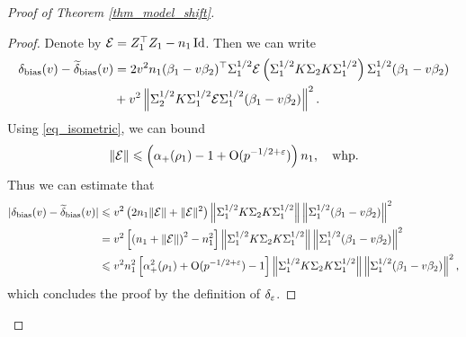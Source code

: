 \begin{proof}[Proof of Theorem \ref{thm_model_shift}]
\begin{proof}
	Denote by $\mathcal{E} = Z_1^{\top}Z_1 - {n_1}\operatorname{Id}$. Then we can write
	\begin{align}
		 \delta_{\text{bias}}(v)-\widetilde\delta_{\text{bias}}(v)&= {2v^2n_1}(\beta_1 - v\beta_2)^{\top}\Sigma_1^{1/2} \mathcal{E}\left(\Sigma_1^{1/2}K \Sigma_2 K \Sigma_1^{1/2}\right) \Sigma_1^{1/2} (\beta_1 - v\beta_2) \nonumber
		\\
		&+ v^2\left\| \Sigma_2^{1/2} K \Sigma_1^{1/2}\mathcal{E} \Sigma_1^{1/2}(\beta_1 - v\beta_2) \right\|^2. \label{eq_lem_model_shift_1}
	\end{align}
	Using \eqref{eq_isometric}, we can bound  
	$$\|\mathcal E\|\leqslant \left( \alpha_+(\rho_1)-1 + \operatorname{O}(p^{-1/2+{\varepsilon}})\right)n_1, \quad \text{whp}.$$
	Thus we can estimate that 
	\begin{align*}
	| \delta_{\text{bias}}(v)-\widetilde\delta_{\text{bias}}(v)|&\leqslant v^2 \left( 2n_1  \|\mathcal E\| +  \|\mathcal E\|^2 \right) \left\| \Sigma_1^{1/2} K \Sigma_2 K \Sigma_1^{1/2} \right\| \left\| \Sigma_1^{1/2} (\beta_1 - v\beta_2) \right\|^2 \\
	&=  v^2 \left[\left( n_1 + \|\mathcal E\|\right)^2 -n_1^2 \right] \left\| \Sigma_1^{1/2} K \Sigma_2 K \Sigma_1^{1/2} \right\| \left\| \Sigma_1^{1/2} (\beta_1 - v\beta_2) \right\|^2 \\
	& \leqslant v^2 n_1^2 \left[ \alpha_+^2(\rho_1) + \operatorname{O}(p^{-1/2+{\varepsilon}}) -1\right]\left\| \Sigma_1^{1/2} K \Sigma_2 K \Sigma_1^{1/2} \right\| \left\| \Sigma_1^{1/2} (\beta_1 - v\beta_2) \right\|^2,
	\end{align*}
	which concludes the proof by the definition of $\delta_{\varepsilon}$.	

\end{proof}
\end{proof}
